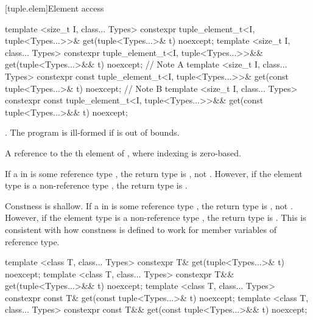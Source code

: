 [tuple.elem]{Element access}

%
\begin{itemdecl}
template <size_t I, class... Types>
  constexpr tuple_element_t<I, tuple<Types...>>&
    get(tuple<Types...>& t) noexcept;
template <size_t I, class... Types>
  constexpr tuple_element_t<I, tuple<Types...>>&&
    get(tuple<Types...>&& t) noexcept;        // Note A
template <size_t I, class... Types>
  constexpr const tuple_element_t<I, tuple<Types...>>&
    get(const tuple<Types...>& t) noexcept;   // Note B
template <size_t I, class... Types>
  constexpr const tuple_element_t<I, tuple<Types...>>&& get(const tuple<Types...>&& t) noexcept;
\end{itemdecl}

\begin{itemdescr}
\pnum
\requires {}.
The program is ill-formed if  is out of bounds.

\pnum
\returns  A reference to the th element of , where
indexing is zero-based.

\pnum
\begin{note}[Note A]
If a  in  is some reference type ,
the return type is , not .
However, if the element type is a non-reference type ,
the return type is .
\end{note}

\pnum
\begin{note}[Note B]
Constness is shallow. If a 
in  is some
reference type , the return type is , not .
However, if the element type is a non-reference type ,
the return type is .
This is consistent with how constness is defined to work
for member variables of reference type.
\end{note}
\end{itemdescr}

%
\begin{itemdecl}
template <class T, class... Types>
  constexpr T& get(tuple<Types...>& t) noexcept;
template <class T, class... Types>
  constexpr T&& get(tuple<Types...>&& t) noexcept;
template <class T, class... Types>
  constexpr const T& get(const tuple<Types...>& t) noexcept;
template <class T, class... Types>
  constexpr const T&& get(const tuple<Types...>&& t) noexcept;
\end{itemdecl}

